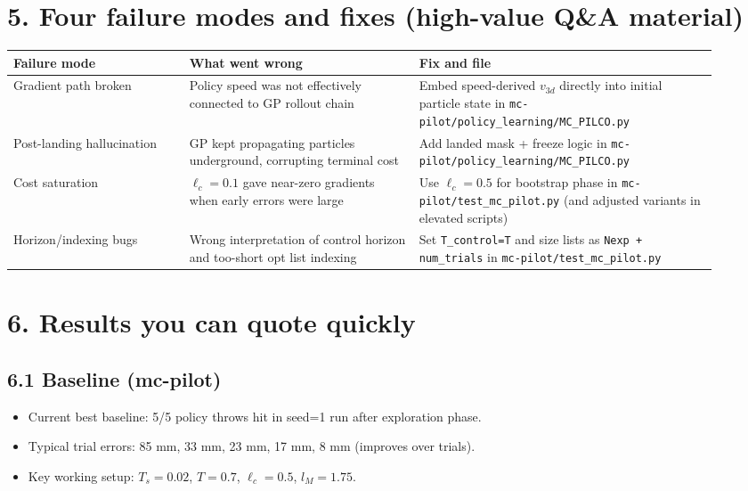 \documentclass[11pt]{article}
\begin{document}
\section*{5. Four failure modes and fixes (high-value Q\&A material)}
\begin{longtable}{p{0.23\linewidth} p{0.30\linewidth} p{0.39\linewidth}}
\toprule
\textbf{Failure mode} & \textbf{What went wrong} & \textbf{Fix and file} \\
\midrule
Gradient path broken & Policy speed was not effectively connected to GP rollout chain & Embed speed-derived $v_{3d}$ directly into initial particle state in \texttt{mc-pilot/policy\_learning/MC\_PILCO.py} \\
Post-landing hallucination & GP kept propagating particles underground, corrupting terminal cost & Add landed mask + freeze logic in \texttt{mc-pilot/policy\_learning/MC\_PILCO.py} \\
Cost saturation & $\ell_c=0.1$ gave near-zero gradients when early errors were large & Use $\ell_c=0.5$ for bootstrap phase in \texttt{mc-pilot/test\_mc\_pilot.py} (and adjusted variants in elevated scripts) \\
Horizon/indexing bugs & Wrong interpretation of control horizon and too-short opt list indexing & Set \texttt{T\_control=T} and size lists as \texttt{Nexp + num\_trials} in \texttt{mc-pilot/test\_mc\_pilot.py} \\
\bottomrule
\end{longtable}

\section*{6. Results you can quote quickly}
\subsection*{6.1 Baseline (mc-pilot)}
\begin{itemize}
\item Current best baseline: 5/5 policy throws hit in seed=1 run after exploration phase.
\item Typical trial errors: 85 mm, 33 mm, 23 mm, 17 mm, 8 mm (improves over trials).
\item Key working setup: $T_s=0.02$, $T=0.7$, $\ell_c=0.5$, $l_M=1.75$.
\end{itemize}
\end{document}
